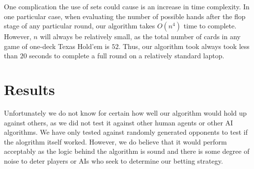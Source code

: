 \documentclass[10pt, a4paper, twocolumn]{article} %
\begin{document}
One complication the use of sets could cause is an increase in time complexity. In one particular case, when evaluating the number of possible hands after the flop stage of any particular round, our algorithm takes $O(n^4)$ time to complete. However, $n$ will always be relatively small, as the total number of cards in any game of one-deck Texas Hold'em is $52$. Thus, our algorithm took always took less than $20$ seconds to complete a full round on a relatively standard laptop.


\section{Results}

Unfortunately we do not know for certain how well our algorithm would hold up against others, as we did not test it against other human agents or other AI algorithms. We have only tested against randomly generated opponents to test if the alogrithm itself worked. However, we do believe that it would perform acceptably as the logic behind the algorithm is sound and there is some degree of noise to deter players or AIs who seek to determine our betting strategy.


\printbibliography[title={Bibliography}] %

\end{document}
